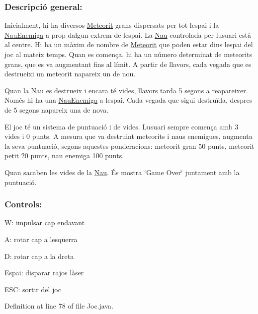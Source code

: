 \subsubsection*{Descripció general\+: }

Inicialment, hi ha diversos \hyperlink{class_meteorit}{Meteorit} grans dispersats per tot l\textquotesingle{}espai i la \hyperlink{class_nau_enemiga}{Nau\+Enemiga} a prop d\textquotesingle{}algun extrem de l\textquotesingle{}espai. La \hyperlink{class_nau}{Nau} controlada per l\textquotesingle{}usuari està al centre. Hi ha un màxim de nombre de \hyperlink{class_meteorit}{Meteorit} que poden estar dins l\textquotesingle{}espai del joc al mateix temps. Quan es comença, hi ha un número determinat de meteorits grans, que es va augmentant fins al límit. A partir de llavors, cada vegada que es destrueixi un meteorit n\textquotesingle{}apareix un de nou.

Quan la \hyperlink{class_nau}{Nau} es destrueix i encara té vides, llavors tarda 5 segons a reapareixer. Només hi ha una \hyperlink{class_nau_enemiga}{Nau\+Enemiga} a l\textquotesingle{}espai. Cada vegada que sigui destruïda, despres de 5 segons n\textquotesingle{}apareix una de nova.

El joc té un sistema de puntuació i de vides. L\textquotesingle{}usuari sempre comença amb 3 vides i 0 punts. A mesura que va destruint meteorits i naus enemigues, augmenta la seva puntuació, segons aquestes ponderacions\+: meteorit gran 50 punts, meteorit petit 20 punts, nau enemiga 100 punts.

Quan s\textquotesingle{}acaben les vides de la \hyperlink{class_nau}{Nau}. És mostra \char`\"{}\+Game Over\char`\"{} juntament amb la puntuació.

\subsubsection*{Controls\+: }


\begin{DoxyItemize}
\item W\+: impulsar cap endavant
\item A\+: rotar cap a l\textquotesingle{}esquerra
\item D\+: rotar cap a la dreta
\item Espai\+: disparar rajos làser
\item E\+S\+C\+: sortir del joc 
\end{DoxyItemize}

Definition at line 78 of file Joc.\+java.



